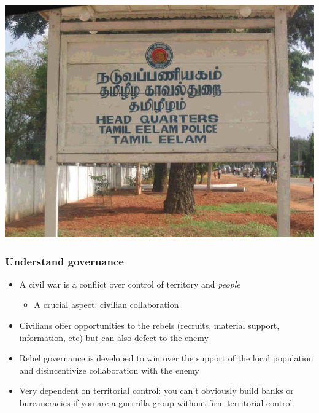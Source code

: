 \documentclass[utf8, xcolor=dvipsnames]{beamer}
\begin{document}
\begin{frame}
\begin{minipage}{0.59\textwidth}
  \includegraphics[width = \textwidth]{img/tamileelam_police}
\end{minipage}

\end{frame}

\begin{frame}
\frametitle{Understand governance}
\centering

\begin{itemize}
  \item<1-> A civil war is a conflict over control of territory and \textit{people}
  \begin{itemize}
    \item A crucial aspect: civilian collaboration
  \end{itemize}
  \item<2-> Civilians offer opportunities to the rebels (recruits, material support, information, etc) but can also defect to the enemy
  \item<3-> Rebel governance is developed to win over the support of the local population and disincentivize collaboration with the enemy
  \item<4-> Very dependent on territorial control: you can't obviously build banks or bureaucracies if you are a guerrilla group without firm territorial control
\end{itemize}

\end{frame}
\end{document}

